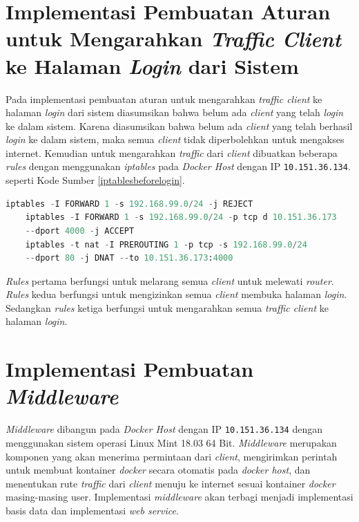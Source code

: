   \section{Implementasi Pembuatan Aturan untuk Mengarahkan \textit{Traffic Client} ke Halaman \textit{Login} dari Sistem}
  Pada implementasi pembuatan aturan untuk mengarahkan \textit{traffic client} ke halaman \textit{login} dari sistem diasumsikan bahwa belum ada \textit{client} yang telah \textit{login} ke dalam sistem. Karena diasumsikan bahwa belum ada \textit{client} yang telah berhasil \textit{login} ke dalam sistem, maka semua \textit{client} tidak diperbolehkan untuk mengakses internet. Kemudian untuk mengarahkan \textit{traffic} dari \textit{client} dibuatkan beberapa \textit{rules} dengan menggunakan \textit{iptables} pada \textit{Docker Host} dengan IP \texttt{10.151.36.134}. seperti Kode Sumber \ref{iptablesbeforelogin}. \\
  \begin{minipage}{\linewidth}
  	\begin{lstlisting}[caption=Command untuk mengarahkan \textit{client} ke halaman \textit{login},language=Python,label=iptablesbeforelogin]
  	iptables -I FORWARD 1 -s 192.168.99.0/24 -j REJECT
  	iptables -I FORWARD 1 -s 192.168.99.0/24 -p tcp d 10.151.36.173
  	--dport 4000 -j ACCEPT
  	iptables -t nat -I PREROUTING 1 -p tcp -s 192.168.99.0/24
  	--dport 80 -j DNAT --to 10.151.36.173:4000
  	\end{lstlisting}
  \end{minipage}  
  \indent \textit{Rules} pertama berfungsi untuk melarang semua \textit{client} untuk melewati \textit{router}. \textit{Rules} kedua berfungsi untuk mengizinkan semua \textit{client} membuka halaman \textit{login}. Sedangkan \textit{rules} ketiga berfungsi untuk mengarahkan semua \textit{traffic client} ke halaman \textit{login}.
	
  \section{Implementasi Pembuatan \textit{Middleware}}
  \textit{Middleware} dibangun pada \textit{Docker Host} dengan IP \texttt{10.151.36.134} dengan menggunakan sistem operasi Linux Mint 18.03 64 Bit. \textit{Middleware} merupakan komponen yang akan menerima permintaan dari \textit{client}, mengirimkan perintah untuk membuat kontainer \textit{docker} secara otomatis pada \textit{docker host}, dan menentukan rute \textit{traffic} dari \textit{client} menuju ke internet sesuai kontainer \textit{docker} masing-masing user. Implementasi \textit{middleware} akan terbagi menjadi implementasi basis data dan implementasi \textit{web service}.
  
